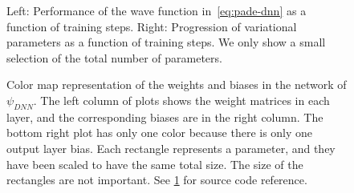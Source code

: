 \documentclass[Thesis.tex]{subfiles}
\begin{document}
\begin{figure}[h]
   \centering
    \resizebox{\linewidth}{!}{%
        
    }
    \caption[Learning progression of a neural network on quantum dots]{\label{fig:QD-pade-dnn-training}Left: Performance of the wave
function in~\cref{eq:pade-dnn} as a function of training steps. Right:
Progression of variational parameters as a function of training steps. We only
show a small selection of the total number of parameters.}
\end{figure}

\begin{table}[h]
  \centering
  \label{tab:pade-dnn-energy-results}
  \caption[Energy estimates using a neural network on quantum dots]{Energy using the neural network wave function in~\cref{eq:pade-dnn}, along with
the benchmark wave function after the same amount of optimization. Results obtained
from $2^{22}$ samples and errors estimated by an automated blocking
algorithm by~\textcite{Jonsson-2018}. Energies in atomic units $[\si{\au}]$. See
\cref{fig:QD-pade-dnn-training} for source code reference.}
  
\end{table}

%         

\begin{figure}[h]
   \centering
    \resizebox{\linewidth}{!}{%
        
    }
    \caption[Weights of a neural network trained on quantum dots]{\label{fig:QD-pade-dnn-weights}Color map representation of the
weights and biases in the network of $\psi_{DNN}$. The left column of plots
shows the weight matrices in each layer, and the corresponding biases are in the
right column. The bottom right plot has only one color because there is only one
output layer bias. Each rectangle represents a parameter, and they have been
scaled to have the same total size. The size of the rectangles are not
important. See \cref{fig:QD-pade-dnn-training} for source code reference.}
\end{figure}
\end{document}
